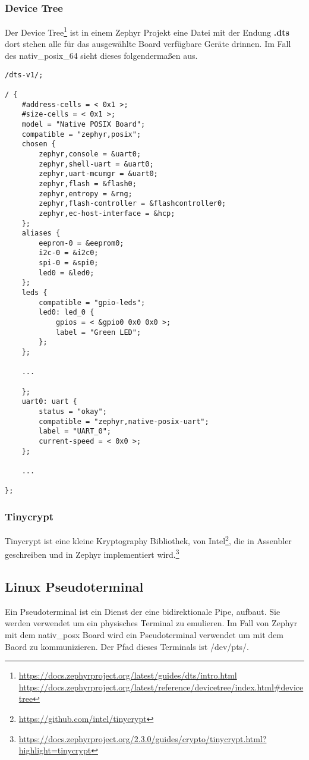     \subsubsection{Device Tree}
    Der Device Tree\footnote{\url{https://docs.zephyrproject.org/latest/guides/dts/intro.html}\\\url{https://docs.zephyrproject.org/latest/reference/devicetree/index.html\#devicetree}} ist 
    in einem Zephyr Projekt eine Datei mit der Endung \textbf{.dts} dort stehen alle für das ausgewählte Board verfügbare Geräte drinnen.
    Im Fall des nativ\_posix\_64 sieht dieses folgendermaßen aus. 
    \begin{lstlisting}[style=StyleC, captionpos=b, caption=West Beispiel, label=West Beispiel]
/dts-v1/;

/ {
    #address-cells = < 0x1 >;
    #size-cells = < 0x1 >;
    model = "Native POSIX Board";
    compatible = "zephyr,posix";
    chosen {
        zephyr,console = &uart0;
        zephyr,shell-uart = &uart0;
        zephyr,uart-mcumgr = &uart0;
        zephyr,flash = &flash0;
        zephyr,entropy = &rng;
        zephyr,flash-controller = &flashcontroller0;
        zephyr,ec-host-interface = &hcp;
    };
    aliases {
        eeprom-0 = &eeprom0;
        i2c-0 = &i2c0;
        spi-0 = &spi0;
        led0 = &led0;
    };
    leds {
        compatible = "gpio-leds";
        led0: led_0 {
            gpios = < &gpio0 0x0 0x0 >;
            label = "Green LED";
        };
    };

    ...

    };
    uart0: uart {
        status = "okay";
        compatible = "zephyr,native-posix-uart";
        label = "UART_0";
        current-speed = < 0x0 >;
    };
    
    ...

};    
    \end{lstlisting}


\newpage
    \subsubsection{Tinycrypt}
    Tinycrypt ist eine kleine Kryptography Bibliothek, von Intel\footnote{\url{https://github.com/intel/tinycrypt}}, die in Assenbler geschreiben und in Zephyr implementiert wird.\footnote{\url{https://docs.zephyrproject.org/2.3.0/guides/crypto/tinycrypt.html?highlight=tinycrypt}}

     
\subsection{Linux Pseudoterminal}
Ein Pseudoterminal ist ein Dienst der eine bidirektionale Pipe, aufbaut. Sie werden verwendet um ein physisches Terminal zu emulieren. 
Im Fall von Zephyr mit dem nativ\_posx Board wird ein Pseudoterminal verwendet um mit dem Baord zu kommunizieren. Der Pfad dieses Terminals ist /dev/pts/.
